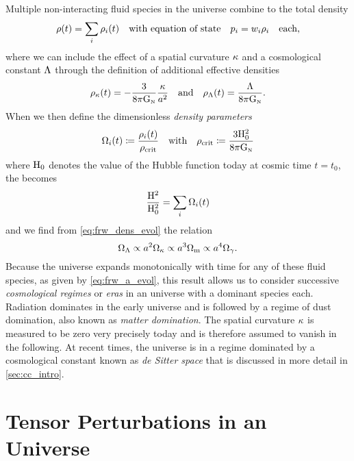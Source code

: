 Multiple non-interacting fluid species in the universe combine to the total density
\begin{equation}
	\rho(t) = \sum_i \rho_i(t) \quad \text{with equation of state} \quad p_i = w_i\rho_i \quad \text{each,}
\end{equation}
where we can include the effect of a spatial curvature \(\kappa\) and a cosmological constant \(\Lambda\) through the definition of additional effective densities
\begin{equation}
	\rho_\kappa(t) = -\frac{3}{8\pi\mathrm{G}_\textnormal{\tiny{N}}}\frac{\kappa}{a^2} \quad \text{and} \quad \rho_\Lambda(t) = \frac{\Lambda}{8\pi\mathrm{G}_\textnormal{\tiny{N}}}.
\end{equation}
When we then define the dimensionless \emph{density parameters}
\begin{equation}
	\Omega_i(t) \coloneqq \frac{\rho_i(t)}{\rho_\textnormal{crit}} \quad \text{with} \quad \rho_\textnormal{crit} \coloneqq \frac{3\mathrm{H}_0^2}{8\pi\mathrm{G}_\textnormal{\tiny{N}}}
\end{equation}
where \(\mathrm{H}_0\) denotes the value of the Hubble function today at cosmic time \(t=t_0\), the  becomes
\begin{equation}\label{eq:friedmann_normalized_dens}
	\frac{\mathrm{H}^2}{\mathrm{H}_0^2} = \sum_i \Omega_i(t)
\end{equation}
and we find from \eqref{eq:frw_dens_evol} the relation
\begin{equation}
	\Omega_\Lambda \propto a^2 \Omega_\kappa \propto a^3 \Omega_{\mathrm{m}} \propto a^4 \Omega_\gamma \mathpunct{.}
\end{equation}
Because the universe expands monotonically with time for any of these fluid species, as given by \eqref{eq:frw_a_evol}, this result allows us to consider successive \emph{cosmological regimes} or \emph{eras} in an \FLRW{} universe with a dominant species each. Radiation dominates in the early universe and is followed by a regime of dust domination, also known as \emph{matter domination}. The spatial curvature \(\kappa\) is measured to be zero very precisely today and is therefore assumed to vanish in the following. At recent times, the universe is in a regime dominated by a cosmological constant known as \emph{de Sitter space} that is discussed in more detail in \autoref{sec:cc_intro}.


\section{Tensor Perturbations in an \FLRW{} Universe}\label{sec:perturb}

